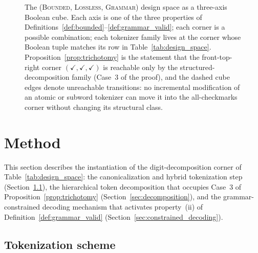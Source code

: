 \documentclass[11pt]{article}
\begin{document}
\begin{figure}[htbp]
\caption{The (\textsc{Bounded}, \textsc{Lossless}, \textsc{Grammar}) design space as a three-axis Boolean cube. Each axis is one of the three properties of Definitions~\ref{def:bounded}--\ref{def:grammar_valid}; each corner is a possible combination; each tokenizer family lives at the corner whose Boolean tuple matches its row in Table~\ref{tab:design_space}. Proposition~\ref{prop:trichotomy} is the statement that the front-top-right corner $(\checkmark,\checkmark,\checkmark)$ is reachable only by the structured-decomposition family (Case~3 of the proof), and the dashed cube edges denote unreachable transitions: no incremental modification of an atomic or subword tokenizer can move it into the all-checkmarks corner without changing its structural class.}
\label{fig:design_space_cube}
\end{figure}

\section{Method}
\label{sec:method}

This section describes the instantiation of the digit-decomposition corner of Table~\ref{tab:design_space}: the canonicalization and hybrid tokenization step (Section~\ref{sec:tokenization}), the hierarchical token decomposition that occupies Case~3 of Proposition~\ref{prop:trichotomy} (Section~\ref{sec:decomposition}), and the grammar-constrained decoding mechanism that activates property~(ii) of Definition~\ref{def:grammar_valid} (Section~\ref{sec:constrained_decoding}).

\subsection{Tokenization scheme}
\label{sec:tokenization}
\end{document}
